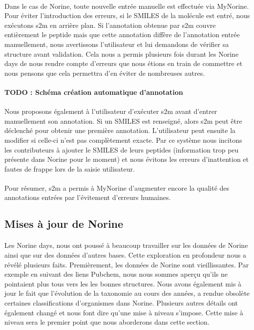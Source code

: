 \documentclass[12pt,french,twoside]{report}
\begin{document}
\paragraph{}Dans le cas de Norine, toute nouvelle entrée manuelle est effectuée via MyNorine.
Pour éviter l'introduction des erreurs, si le SMILES de la molécule est entré, nous exécutons s2m en arrière plan.
Si l'annotation obtenue par s2m couvre entièrement le peptide mais que cette annotation diffère de l'annotation entrée manuellement, nous avertissons l'utilisateur et lui demandons de vérifier sa structure avant validation.
Cela nous a permis plusieurs fois durant les Norine days de nous rendre compte d'erreurs que nous étions en train de commettre et nous pensons que cela permettra d'en éviter de nombreuses autres.

\paragraph{TODO : Schéma création automatique d'annotation}

\paragraph{}Nous proposons également à l'utilisateur d'exécuter s2m avant d'entrer manuellement son annotation.
Si un SMILES est renseigné, alors s2m peut être déclenché pour obtenir une première annotation.
L'utilisateur peut ensuite la modifier si celle-ci n'est pas complètement exacte.
Par ce système nous incitons les contributeurs à ajouter le SMILES de leurs peptides (information trop peu présente dans Norine pour le moment) et nous évitons les erreurs d'inattention et fautes de frappe lors de la saisie utilisateur.

\paragraph{}Pour résumer, s2m a permis à MyNorine d'augmenter encore la qualité des annotations entrées par l'évitement d'erreurs humaines.




\subsection{Mises à jour de Norine}

\paragraph{}Les Norine days, nous ont poussé à beaucoup travailler sur les données de Norine ainsi que sur des données d'autres bases.
Cette exploration en profondeur nous a révélé plusieurs faits.
Premièrement, les données de Norine sont vieillissantes.
Par exemple en suivant des liens Pubchem, nous nous sommes aperçu qu'ils ne pointaient plus tous vers les les bonnes structures.
Nous avons également mis à jour le fait que l'évolution de la taxonomie au cours des années, a rendue obsolète certaines classifications d'organismes dans Norine.
Plusieurs autres détails ont également changé et nous font dire qu'une mise à niveau s'impose.
Cette mise à niveau sera le premier point que nous aborderons dans cette section.
\end{document}
